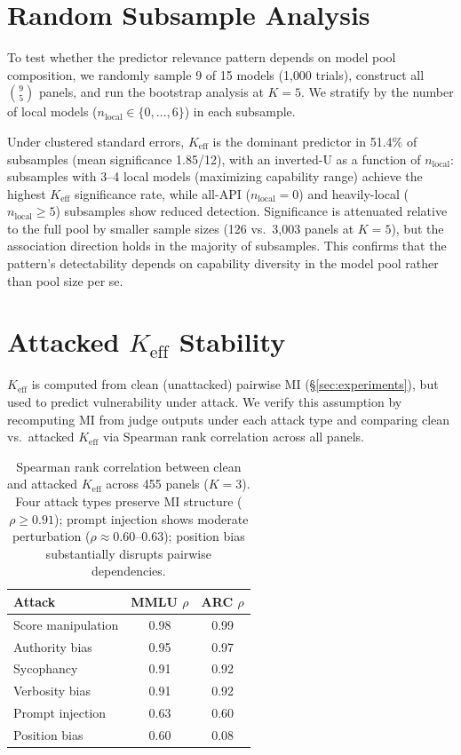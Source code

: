 \FloatBarrier
\section{Random Subsample Analysis}
\label{app:random_subsample}

To test whether the predictor relevance pattern depends on model pool composition, we randomly sample 9 of 15 models (1{,}000 trials), construct all $\binom{9}{5}$ panels, and run the bootstrap analysis at $K{=}5$. We stratify by the number of local models ($n_{\mathrm{local}} \in \{0, \ldots, 6\}$) in each subsample.

Under clustered standard errors, $K_{\mathrm{eff}}$ is the dominant predictor in 51.4\% of subsamples (mean significance 1.85/12), with an inverted-U as a function of $n_{\mathrm{local}}$: subsamples with 3--4 local models (maximizing capability range) achieve the highest $K_{\mathrm{eff}}$ significance rate, while all-API ($n_{\mathrm{local}}{=}0$) and heavily-local ($n_{\mathrm{local}}{\geq}5$) subsamples show reduced detection. Significance is attenuated relative to the full pool by smaller sample sizes (126 vs.\ 3{,}003 panels at $K{=}5$), but the association direction holds in the majority of subsamples. This confirms that the pattern's detectability depends on capability diversity in the model pool rather than pool size per se.

\FloatBarrier
\section{Attacked $K_{\mathrm{eff}}$ Stability}
\label{app:attacked_keff}

$K_{\mathrm{eff}}$ is computed from clean (unattacked) pairwise MI (\S\ref{sec:experiments}), but used to predict vulnerability under attack. We verify this assumption by recomputing MI from judge outputs under each attack type and comparing clean vs.\ attacked $K_{\mathrm{eff}}$ via Spearman rank correlation across all panels.

\begin{table}[h]
\centering
\small
\caption{Spearman rank correlation between clean and attacked $K_{\mathrm{eff}}$ across 455 panels ($K{=}3$). Four attack types preserve MI structure ($\rho{\geq}0.91$); prompt injection shows moderate perturbation ($\rho{\approx}0.60$--$0.63$); position bias substantially disrupts pairwise dependencies.}
\label{tab:attacked_keff}
\begin{tabular}{lcc}
\toprule
\textbf{Attack} & \textbf{MMLU $\rho$} & \textbf{ARC $\rho$} \\
\midrule
Score manipulation & 0.98 & 0.99 \\
Authority bias     & 0.95 & 0.97 \\
Sycophancy         & 0.91 & 0.92 \\
Verbosity bias     & 0.91 & 0.92 \\
Prompt injection   & 0.63 & 0.60 \\
Position bias      & 0.60 & 0.08 \\
\bottomrule
\end{tabular}
\end{table}

